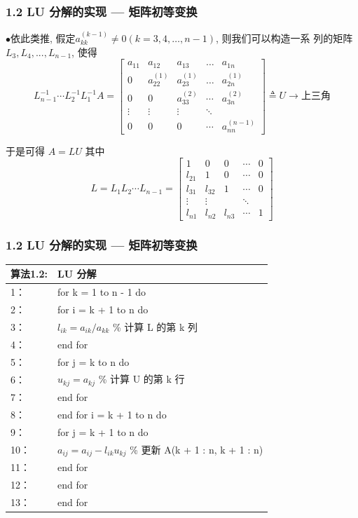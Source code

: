 \documentclass[notheorems,serif]{beamer}
\begin{document}
\begin{frame}
\frametitle{1.2 \quad LU 分解的实现 — 矩阵初等变换}
$\bullet$依此类推, 假定$a_{k k}^{(k-1)} \neq 0(k=3,4, \dots, n-1)$, 则我们可以构造一系
列的矩阵$ L_3, L_4, . . . , L_{n−1}$, 使得
$$
L_{n-1}^{-1} \cdots L_{2}^{-1} L_{1}^{-1} A=\left[\begin{array}{ccccc}{a_{11}} & {a_{12}} & {a_{13}} & {\dots} & {a_{1 n}} \\ {0} & {a_{22}^{(1)}} & {a_{23}^{(1)}} & {\dots} & {a_{2 n}^{(1)}} \\ {0} & {0} & {a_{33}^{(2)}} & {\cdots} & {a_{3 n}^{(2)}} \\ {\vdots} & {\vdots} & {\vdots} & {\ddots} \\ {0} & {0} & {0} & {\cdots} & {a_{n n}^{(n-1)}}\end{array}\right] \triangleq U \rightarrow \text{上三角}
$$

于是可得 $A = LU$ 其中
$$
L=L_{1} L_{2} \cdots L_{n-1}=\left[\begin{array}{ccccc}{1} & {0} & {0} & {\cdots} &{0}\\ {l_{21}} & {1} & {0} & {\cdots} &{0}\\ {l_{31}} & {l_{32}} & {1} & {\cdots} &{0}\\ {\vdots} & {\vdots} & { }& {\ddots} & { }\\ {l_{n 1}} & {l_{n 2}} & {l_{n 3}} & {\cdots} &{1}\end{array}\right]
$$
\end{frame}

\begin{frame}
\frametitle{1.2 \quad LU 分解的实现 — 矩阵初等变换}
\begin{table}  
	\begin{tabular*}{16cm}{ll}  
		\hline  
		算法1.2: &LU 分解 \\  
		\hline  
		1：   &for k = 1 to n - 1 do\\  
		2：   &\qquad for i = k + 1 to n do\\
		3：   &\qquad \qquad $l_{ik} = a_{ik}/a_{kk}$ \% 计算 L 的第 k 列\\
		4：   &\qquad end for\\
		5：   &\qquad for j = k to n do\\
		6：   &\qquad \qquad $u_{kj} = a_{kj}$ \% 计算 U 的第 k 行\\
		7：   &\qquad end for\\
		8：   &\qquad end for i = k + 1 to n do\\
		9：   & \qquad \qquad for j = k + 1 to n do\\
		10：   &\qquad \qquad \qquad $a_{ij}= a_{ij} − l_{ik}u_{kj}$ \% 更新 A(k + 1 : n, k + 1 : n)\\
		11：   &\qquad \qquad end for\\
		12：   &\qquad end for\\
		13：   &end for\\
		\hline  
	\end{tabular*}  
\end{table} 
\end{frame}
\end{document}

